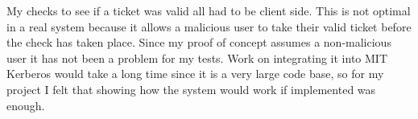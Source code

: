 \documentclass[]{report}   %
\begin{document}
My checks to see if a ticket was valid all had to be client side. This is not optimal in a real system because it allows a malicious user to take their valid ticket before the check has taken place. Since my proof of concept assumes a non-malicious user it has not been a problem for my tests. Work on integrating it into MIT Kerberos would take a long time since it is a very large code base, so for my project I felt that showing how the system would work if implemented was enough.



\end{document}
